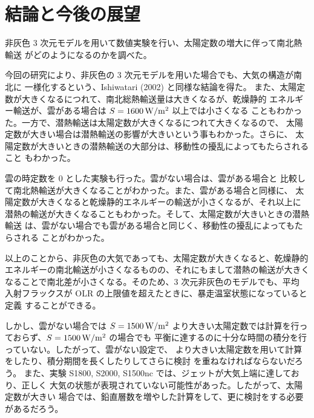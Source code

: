 \documentclass[body]{subfiles}
\begin{document}
\chapter{結論と今後の展望}\label{conclusion}

非灰色 3 次元モデルを用いて数値実験を行い、太陽定数の増大に伴って南北熱輸送
がどのようになるのかを調べた。

今回の研究により、非灰色の 3 次元モデルを用いた場合でも、大気の構造が南北に
一様化するという、Ishiwatari \etal (2002) と同様な結論を得た。
また、太陽定数が大きくなるにつれて、南北総熱輸送量は大きくなるが、乾燥静的
エネルギー輸送が、雲がある場合は \(S=1600\hmu{W/m^2}\) 以上では小さくなる
こともわかった。一方で、潜熱輸送は太陽定数が大きくなるにつれて大きくなるので、
太陽定数が大きい場合は潜熱輸送の影響が大きいという事もわかった。さらに、
太陽定数が大きいときの潜熱輸送の大部分は、移動性の擾乱によってもたらされること
もわかった。

雲の時定数を 0 とした実験も行った。雲がない場合は、雲がある場合と
比較して南北熱輸送が大きくなることがわかった。また、雲がある場合と同様に、
太陽定数が大きくなると乾燥静的エネルギーの輸送が小さくなるが、それ以上に
潜熱の輸送が大きくなることもわかった。そして、太陽定数が大きいときの潜熱輸送
は、雲がない場合でも雲がある場合と同じく、移動性の擾乱によってもたらされる
ことがわかった。

以上のことから、非灰色の大気であっても、太陽定数が大きくなると、乾燥静的
エネルギーの南北輸送が小さくなるものの、それにもまして潜熱の輸送が大きく
なることで南北差が小さくなる。そのため、3 次元非灰色のモデルでも、平均
入射フラックスが OLR の上限値を超えたときに、暴走温室状態になっていると定義
することができる。

しかし、雲がない場合では \(S=1500\hmu{W/m^2}\)
より大きい太陽定数では計算を行っておらず、\(S=1500\hmu{W/m^2}\) の場合でも
平衡に達するのに十分な時間の積分を行っていない。したがって、雲がない設定で、
より大きい太陽定数を用いて計算をしたり、積分期間を長くしたりしてさらに検討
を重ねなければならないだろう。
また、実験 S1800, S2000, S1500nc では、ジェットが大気上端に達しており、正しく
大気の状態が表現されていない可能性があった。したがって、太陽定数が大きい
場合では、鉛直層数を増やした計算をして、更に検討をする必要があるだろう。
\end{document}
